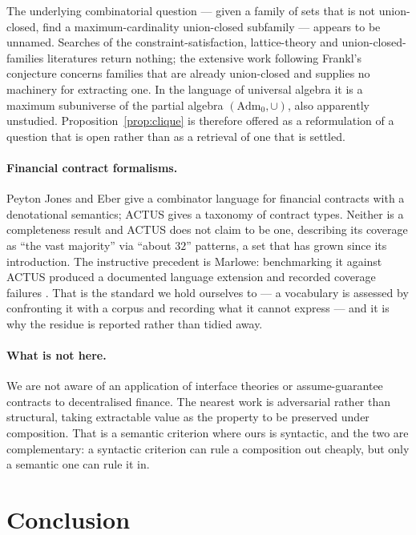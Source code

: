 \documentclass[11pt,reqno]{amsart}
\theoremstyle{plain}
\theoremstyle{definition}
\theoremstyle{remark}
\newcommand{\Adm}{\mathrm{Adm}_{0}}
\begin{document}
The underlying combinatorial question --- given a family of sets that is not
union-closed, find a maximum-cardinality union-closed subfamily --- appears to be
unnamed. Searches of the constraint-satisfaction, lattice-theory and
union-closed-families literatures return nothing; the extensive work following
Frankl's conjecture concerns families that are already union-closed and supplies
no machinery for extracting one. In the language of universal algebra it is a
maximum subuniverse of the partial algebra $(\Adm, \cup)$, also apparently
unstudied. Proposition~\ref{prop:clique} is therefore offered as a reformulation
of a question that is open rather than as a retrieval of one that is settled.

\paragraph{Financial contract formalisms.} Peyton Jones and Eber
\cite{peytonjones2000} give a combinator language for financial contracts with a
denotational semantics; ACTUS \cite{actus} gives a taxonomy of contract types.
Neither is a completeness result and ACTUS does not claim to be one, describing
its coverage as ``the vast majority'' via ``about $32$'' patterns, a set that has
grown since its introduction. The instructive precedent is Marlowe: benchmarking
it against ACTUS produced a documented language extension and recorded coverage
failures \cite{kondratiuk2021}. That is the standard we hold ourselves to --- a
vocabulary is assessed by confronting it with a corpus and recording what it
cannot express --- and it is why the residue is reported rather than tidied away.

\paragraph{What is not here.} We are not aware of an application of interface
theories or assume-guarantee contracts to decentralised finance. The nearest work
is adversarial rather than structural, taking extractable value as the property
to be preserved under composition. That is a semantic criterion where ours is
syntactic, and the two are complementary: a syntactic criterion can rule a
composition out cheaply, but only a semantic one can rule it in.

\section{Conclusion}
\end{document}
